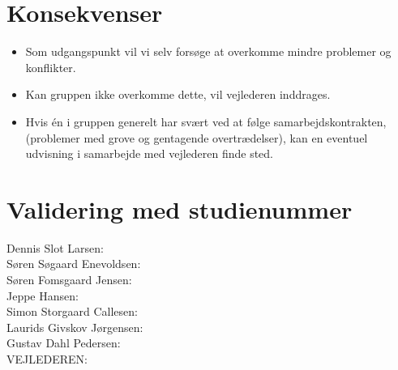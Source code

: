 \section{Konsekvenser}
\begin{itemize}
	\item Som udgangspunkt vil vi selv forsøge at overkomme mindre problemer og konflikter.
	\item Kan gruppen ikke overkomme dette, vil vejlederen inddrages.
	\item Hvis én i gruppen generelt har svært ved at følge samarbejdskontrakten, (problemer med grove og gentagende overtrædelser), kan en eventuel udvisning i samarbejde med vejlederen finde sted.
\end{itemize}

\section{Validering med studienummer}
Dennis Slot Larsen: \\
Søren Søgaard Enevoldsen: \\
Søren Fomsgaard Jensen: \\
Jeppe Hansen: \\
Simon Storgaard Callesen: \\
Laurids Givskov Jørgensen: \\
Gustav Dahl Pedersen: \\
VEJLEDEREN: \\
